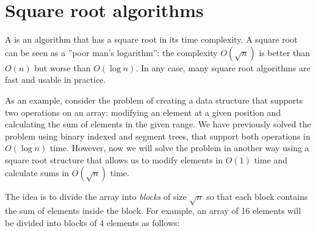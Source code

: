\chapter{Square root algorithms}


A  is an algorithm
that has a square root in its time complexity.
A square root can be seen as a ''poor man's logarithm'':
the complexity $O(\sqrt n)$ is better than $O(n)$
but worse than $O(\log n)$.
In any case, many square root algorithms are fast and usable in practice.

As an example, consider the problem of
creating a data structure that supports
two operations on an array:
modifying an element at a given position
and calculating the sum of elements in the given range.
We have previously solved the problem using
binary indexed and segment trees,
that support both operations in $O(\log n)$ time.
However, now we will solve the problem
in another way using a square root structure
that allows us to modify elements in $O(1)$ time
and calculate sums in $O(\sqrt n)$ time.

The idea is to divide the array into \emph{blocks}
of size $\sqrt n$ so that each block contains
the sum of elements inside the block.
For example, an array of 16 elements will be
divided into blocks of 4 elements as follows:

\begin{center}
\end{center}


